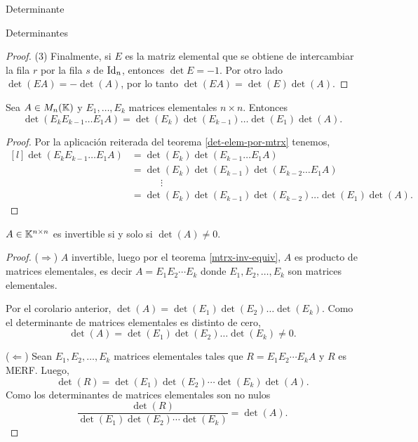 \begin{chapter}{Determinante}
\begin{section}{Determinantes}
\begin{proof}
      (3) Finalmente, si $E$ es la matriz elemental que se obtiene de intercambiar la fila $r$ por la fila $s$ de $\operatorname{Id}_n$, entonces $\det E=-1$. Por  otro lado  $\det(EA) = -\det(A)$, por lo tanto  $\det(EA) = \det(E)\det(A)$.
  \end{proof}

  \begin{corolario}\label{coro-det-prod-elem-mtrx}
      Sea $A  \in M_n(\mathbb K)$ y $E_1,\ldots,E_k$ matrices elementales $n \times n$. Entonces
      \begin{equation*}
          \det (E_kE_{k-1}\ldots E_1A) = \det (E_k) \det (E_{k-1})\ldots \det (E_1) \det (A).
      \end{equation*}
  \end{corolario}
  \begin{proof}
      Por  la aplicación reiterada del teorema \ref{det-elem-por-mtrx} tenemos,
      \begin{equation*}
          \begin{matrix*}[l]
              \det (E_kE_{k-1}\ldots E_1A) &= \det (E_k) \det(E_{k-1}\ldots E_1 A) \\
              &= \det( E_k) \det(E_{k-1})\det(E_{k-2}\ldots E_1A) \\
              &\qquad\quad \vdots \\
              & = \det( E_k) \det(E_{k-1})\det(E_{k-2})\ldots \det(E_1) \det(A).
          \end{matrix*}
      \end{equation*}
  \end{proof}

  \begin{teorema}\label{th-det-matriz-invertible}
      $A \in \mathbb K^{n \times n}$ es invertible si y solo si $\det(A) \ne 0$.
  \end{teorema}
  \begin{proof}
      ($\Rightarrow$)  $A$ invertible, luego por el  teorema \ref{mtrx-inv-equiv}, $A$ es producto de matrices elementales, es decir  $A = E_1 E_2 \cdots E_k$  donde $E_1, E_2, \ldots, E_k$ son matrices elementales.

      Por el corolario anterior,  $\det(A) = \det(E_1) \det(E_2) \ldots \det(E_k)$. Como el determinante de matrices elementales es distinto de cero, $$\det(A) = \det(E_1) \det(E_2) \ldots \det(E_k)\ne 0.$$

      ($\Leftarrow$) Sean $E_1, E_2, \ldots, E_k$ matrices elementales tales que $R = E_1 E_2 \cdots E_k A$ y $R$ es MERF. Luego,
      \begin{equation*}
          \det(R) = \det(E_1) \det(E_2) \cdots \det(E_k) \det(A).
      \end{equation*}
      Como los determinantes de matrices  elementales son no nulos
      \begin{equation*}
          \frac{\det(R)}{\det(E_1) \det(E_2) \cdots \det(E_k) } = \det(A). \tag{*}
      \end{equation*}



\end{proof}
\end{section}
\end{chapter}
